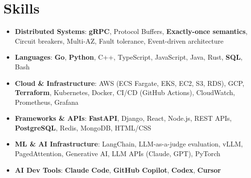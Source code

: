 \documentclass[letterpaper,11pt]{article}
\newcommand{\resumeSubHeadingListStart}{\begin{itemize}[leftmargin=0.15in, label={}]}
\newcommand{\resumeSubHeadingListEnd}{\end{itemize}}
\newcommand{\resumeSkillHeading}[2]{%
  \item\small{\textbf{#1}: #2 \vspace{-9pt}}%
}
\begin{document}
\section{Skills}
  \resumeSubHeadingListStart
    \resumeSkillHeading{Distributed Systems}{\textbf{gRPC}, Protocol Buffers, \textbf{Exactly-once semantics}, Circuit breakers, Multi-AZ, Fault tolerance, Event-driven architecture}
    \resumeSkillHeading{Languages}{\textbf{Go}, \textbf{Python}, C++, TypeScript, JavaScript, Java, Rust, \textbf{SQL}, Bash}
    \resumeSkillHeading{Cloud \& Infrastructure}{AWS (ECS Fargate, EKS, EC2, S3, RDS), GCP, \textbf{Terraform}, Kubernetes, Docker, CI/CD (GitHub Actions), CloudWatch, Prometheus, Grafana}
    \resumeSkillHeading{Frameworks \& APIs}{\textbf{FastAPI}, Django, React, Node.js, REST APIs, \textbf{PostgreSQL}, Redis, MongoDB, HTML/CSS}
    \resumeSkillHeading{ML \& AI Infrastructure}{LangChain, LLM-as-a-judge evaluation, vLLM, PagedAttention, Generative AI, LLM APIs (Claude, GPT), PyTorch}
    \resumeSkillHeading{AI Dev Tools}{\textbf{Claude Code}, \textbf{GitHub Copilot}, \textbf{Codex}, \textbf{Cursor}}
  \resumeSubHeadingListEnd
\end{document}

